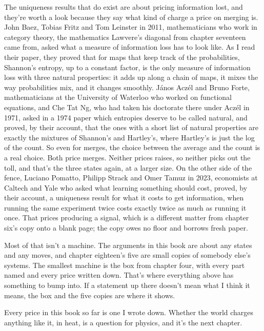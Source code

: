 \documentclass[11pt,twoside]{article}
\theoremstyle{thielethm}
\theoremstyle{thieledef}
\theoremstyle{thieledef}
\theoremstyle{thieledef}
\theoremstyle{thielethm}
\theoremstyle{thieleobs}
\theoremstyle{thielethm}
\begin{document}
The uniqueness results that do exist are about pricing information lost, and they're worth a look because they say what kind of charge a price on merging is. John Baez, Tobias Fritz and Tom Leinster in 2011, mathematicians who work in category theory, the mathematics Lawvere's diagonal from chapter seventeen came from, asked what a measure of information loss has to look like. As I read their paper, they proved that for maps that keep track of the probabilities, Shannon's entropy, up to a constant factor, is the only measure of information loss with three natural properties: it adds up along a chain of maps, it mixes the way probabilities mix, and it changes smoothly. János Aczél and Bruno Forte, mathematicians at the University of Waterloo who worked on functional equations, and Che Tat Ng, who had taken his doctorate there under Aczél in 1971, asked in a 1974 paper which entropies deserve to be called natural, and proved, by their account, that the ones with a short list of natural properties are exactly the mixtures of Shannon's and Hartley's, where Hartley's is just the log of the count. So even for merges, the choice between the average and the count is a real choice. Both price merges. Neither prices raises, so neither picks out the toll, and that's the three states again, at a larger size. On the other side of the fence, Luciano Pomatto, Philipp Strack and Omer Tamuz in 2023, economists at Caltech and Yale who asked what learning something should cost, proved, by their account, a uniqueness result for what it costs to get information, when running the same experiment twice costs exactly twice as much as running it once. That prices producing a signal, which is a different matter from chapter six's copy onto a blank page; the copy owes no floor and borrows fresh paper.

Most of that isn't a machine. The arguments in this book are about any states and any moves, and chapter eighteen's five are small copies of somebody else's systems. The smallest machine is the box from chapter four, with every part named and every price written down. That's where everything above has something to bump into. If a statement up there doesn't mean what I think it means, the box and the five copies are where it shows.

Every price in this book so far is one I wrote down. Whether the world charges anything like it, in heat, is a question for physics, and it's the next chapter.

\end{document}
